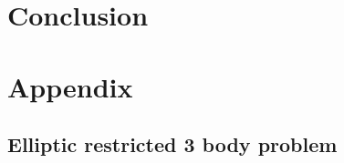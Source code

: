 \documentclass{mnras}
\begin{document}
\section{Conclusion}
\label{sec:org763bf87}

\clearpage

\section{Appendix}
\label{sec:org0d352e2}
\subsection{Elliptic restricted 3 body problem}
\label{sec:org330f0ee}



\end{document}
